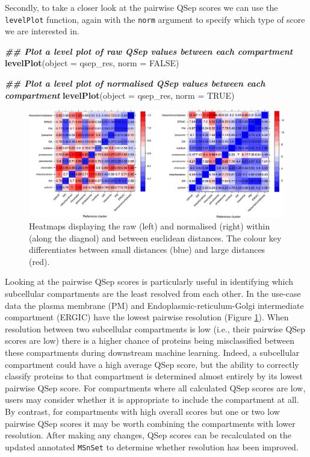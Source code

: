 \documentclass[9pt,a4paper,]{extarticle}
\newenvironment{Shaded}{\begin{snugshade}}{\end{snugshade}}
\newcommand{\AttributeTok}[1]{\textcolor[rgb]{0.13,0.29,0.53}{#1}}
\newcommand{\ConstantTok}[1]{\textcolor[rgb]{0.56,0.35,0.01}{#1}}
\newcommand{\DocumentationTok}[1]{\textcolor[rgb]{0.56,0.35,0.01}{\textbf{\textit{#1}}}}
\newcommand{\FunctionTok}[1]{\textcolor[rgb]{0.13,0.29,0.53}{\textbf{#1}}}
\newcommand{\NormalTok}[1]{#1}
\begin{document}
Secondly, to take a closer look at the pairwise QSep scores we can use the
\texttt{levelPlot} function, again with the \texttt{norm} argument to specify which type of
score we are interested in.

\begin{Shaded}
\begin{Highlighting}[]
\DocumentationTok{\#\# Plot a level plot of raw QSep values between each compartment}
\FunctionTok{levelPlot}\NormalTok{(}\AttributeTok{object =}\NormalTok{ qsep\_res, }\AttributeTok{norm =} \ConstantTok{FALSE}\NormalTok{)}

\DocumentationTok{\#\# Plot a level plot of normalised QSep values between each compartment}
\FunctionTok{levelPlot}\NormalTok{(}\AttributeTok{object =}\NormalTok{ qsep\_res, }\AttributeTok{norm =} \ConstantTok{TRUE}\NormalTok{)}
\end{Highlighting}
\end{Shaded}

\begin{figure}[H]

{\centering \includegraphics[width=0.9\linewidth,]{figs/qsep_levelplots_both} 

}

\caption{Heatmaps displaying the raw (left) and normalised (right) within (along the diagnol) and between euclidean distances. The colour key differentiates between small distances (blue) and large distances (red).}\label{fig:qsep-level-plots}
\end{figure}

Looking at the pairwise QSep scores is particularly useful in identifying which
subcellular compartments are the least resolved from each other. In the use-case
data the plasma membrane (PM) and Endoplasmic-reticulum-Golgi intermediate
compartment (ERGIC) have the lowest pairwise resolution (Figure \ref{fig:qsep-level-plots}).
When resolution between two subcellular compartments is low (i.e., their pairwise QSep scores
are low) there is a higher chance of proteins being misclassified between these
compartments during downstream machine learning. Indeed, a subcellular
compartment could have a high average QSep score, but the ability to correctly
classify proteins to that compartment is determined almost entirely by its
lowest pairwise QSep score. For compartments where all calculated QSep scores are
low, users may consider whether it is appropriate to include the compartment at
all. By contrast, for compartments with high overall scores but one or two low
pairwise QSep scores it may be worth combining the compartments with lower
resolution. After making any changes, QSep scores can be recalculated on the
updated annotated \texttt{MSnSet} to determine whether resolution has been improved.
\end{document}
